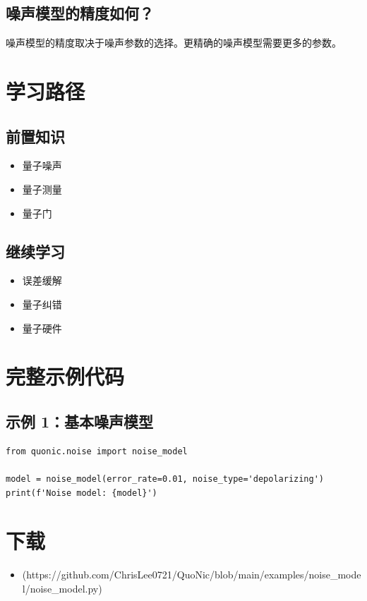 \documentclass[12pt,a4paper]{article}
\begin{document}
\subsection{噪声模型的精度如何？}

噪声模型的精度取决于噪声参数的选择。更精确的噪声模型需要更多的参数。

\section{学习路径}

\subsection{前置知识}
\begin{itemize}
  \item 量子噪声
  \item 量子测量
  \item 量子门
\end{itemize}

\subsection{继续学习}
\begin{itemize}
  \item 误差缓解
  \item 量子纠错
  \item 量子硬件
\end{itemize}

\section{完整示例代码}

\subsection{示例 1：基本噪声模型}

\begin{verbatim}
from quonic.noise import noise_model

model = noise_model(error_rate=0.01, noise_type='depolarizing')
print(f'Noise model: {model}')
\end{verbatim}

\section{下载}

\begin{itemize}
  \item [noise\_model.py](https://github.com/ChrisLee0721/QuoNic/blob/main/examples/noise_model/noise_model.py)
\end{itemize}
\end{document}
